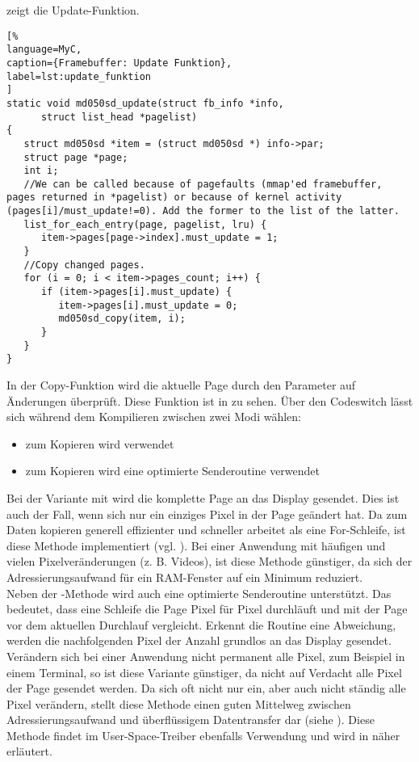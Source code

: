  zeigt die Update-Funktion.
\begin{lstlisting}[%
language=MyC,
caption={Framebuffer: Update Funktion},
label=lst:update_funktion
]
static void md050sd_update(struct fb_info *info,
      struct list_head *pagelist)
{
   struct md050sd *item = (struct md050sd *) info->par;
   struct page *page;
   int i;
   //We can be called because of pagefaults (mmap'ed framebuffer, pages returned in *pagelist) or because of kernel activity (pages[i]/must_update!=0). Add the former to the list of the latter.
   list_for_each_entry(page, pagelist, lru) {
      item->pages[page->index].must_update = 1;
   }
   //Copy changed pages.
   for (i = 0; i < item->pages_count; i++) {
      if (item->pages[i].must_update) {
         item->pages[i].must_update = 0;
         md050sd_copy(item, i);
      }
   }
}
\end{lstlisting}
In der Copy-Funktion wird die aktuelle Page durch den Parameter  auf Änderungen überprüft. Diese Funktion ist in  zu sehen. Über den Codeswitch  lässt sich während dem Kompilieren zwischen zwei Modi wählen:
\begin{itemize}
	\item zum Kopieren wird  verwendet
	\item zum Kopieren wird eine optimierte Senderoutine verwendet
\end{itemize}

Bei der Variante mit  wird die komplette Page an das Display gesendet. Dies ist auch der Fall, wenn sich nur ein einziges Pixel in der Page geändert hat. Da zum Daten kopieren  generell effizienter und schneller arbeitet als eine For-Schleife, ist diese Methode implementiert (vgl. \cite{Nadeau2012}). 
Bei einer Anwendung mit häufigen und vielen Pixelveränderungen (z. B. Videos), ist diese Methode günstiger, da sich der Adressierungsaufwand für ein RAM-Fenster auf ein Minimum reduziert.\\
Neben der -Methode wird auch eine optimierte Senderoutine unterstützt. Das bedeutet, dass eine Schleife die Page Pixel für Pixel durchläuft und mit der Page vor dem aktuellen Durchlauf vergleicht. Erkennt die Routine eine Abweichung, werden die nachfolgenden Pixel der Anzahl  grundlos an das Display gesendet. Verändern sich bei einer Anwendung nicht permanent alle Pixel, zum Beispiel in einem Terminal, so ist diese Variante günstiger, da nicht auf Verdacht alle Pixel der Page gesendet werden. Da sich oft nicht nur ein, aber auch nicht ständig alle Pixel  verändern, stellt diese Methode einen guten Mittelweg zwischen Adressierungsaufwand und überflüssigem Datentransfer dar (siehe \cite{Schlegel2013a}). Diese Methode findet im User-Space-Treiber ebenfalls Verwendung und wird in  näher erläutert.

